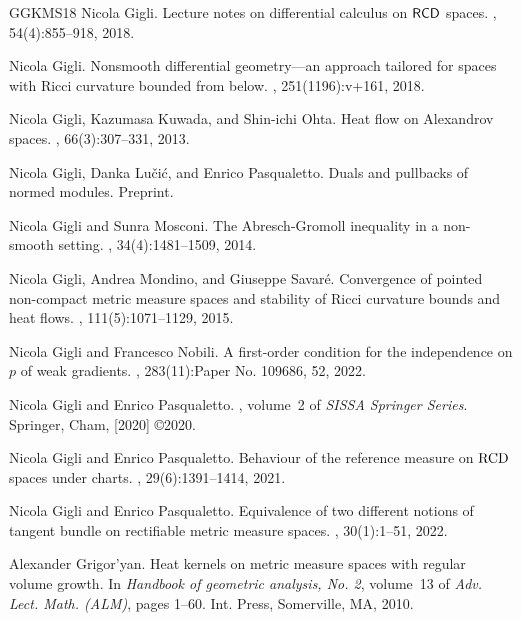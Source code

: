 \documentclass[11pt]{article}
\numberwithin{equation}{section}
\begin{document}
{\begin{thebibliography}{GGKMS18}
Nicola Gigli.
\newblock Lecture notes on differential calculus on {$\sf{RCD}$} spaces.
, 54(4):855--918, 2018.

Nicola Gigli.
\newblock Nonsmooth differential geometry---an approach tailored for spaces
  with {R}icci curvature bounded from below.
, 251(1196):v+161, 2018.

Nicola Gigli, Kazumasa Kuwada, and Shin-ichi Ohta.
\newblock Heat flow on {A}lexandrov spaces.
, 66(3):307--331,
  2013.

Nicola Gigli, Danka Lu\v{c}i\'c, and Enrico Pasqualetto.
\newblock Duals and pullbacks of normed modules.
\newblock Preprint.

Nicola Gigli and Sunra Mosconi.
\newblock The {A}bresch-{G}romoll inequality in a non-smooth setting.
, 34(4):1481--1509, 2014.

Nicola Gigli, Andrea Mondino, and Giuseppe Savar\'e.
\newblock Convergence of pointed non-compact metric measure spaces and
  stability of {R}icci curvature bounds and heat flows.
, 111(5):1071--1129, 2015.

Nicola Gigli and Francesco Nobili.
\newblock A first-order condition for the independence on {$p$} of weak
  gradients.
, 283(11):Paper No. 109686, 52, 2022.

Nicola Gigli and Enrico Pasqualetto.
, volume~2 of {\em
  SISSA Springer Series}.
\newblock Springer, Cham, [2020] \copyright 2020.

Nicola Gigli and Enrico Pasqualetto.
\newblock Behaviour of the reference measure on {$\rm{RCD}$} spaces under
  charts.
, 29(6):1391--1414, 2021.

Nicola Gigli and Enrico Pasqualetto.
\newblock Equivalence of two different notions of tangent bundle on rectifiable
  metric measure spaces.
, 30(1):1--51, 2022.

Alexander Grigor'yan.
\newblock Heat kernels on metric measure spaces with regular volume growth.
\newblock In {\em Handbook of geometric analysis, {N}o. 2}, volume~13 of {\em
  Adv. Lect. Math. (ALM)}, pages 1--60. Int. Press, Somerville, MA, 2010.


\end{thebibliography}}
\end{document}
